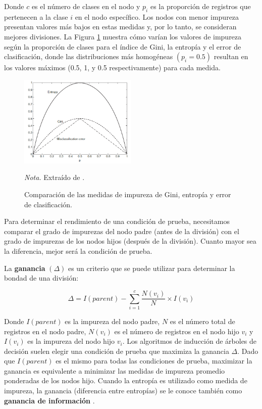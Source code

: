 Donde $c$ es el número de clases en el nodo y $p_{i}$ es la proporción de registros que pertenecen a la clase $i$ en el nodo específico. Los nodos con menor impureza presentan valores más bajos en estas medidas y, 
por lo tanto, se consideran mejores divisiones. La Figura \ref{fig:impurity} muestra cómo varían los valores de impureza según la proporción de clases para el índice de Gini, la entropía y el error de clasificación, 
donde las distribuciones más homogéneas $(p_{i} = 0.5)$ resultan en los valores máximos (0.5, 1, y 0.5 respectivamente) para cada medida.

\begin{figure}[H]
    \centering
    \caption{Comparación de las medidas de impureza de Gini, entropía y error de clasificación.}
    \includegraphics[width=0.5\textwidth]{img/4_marco_teorico/impureza.png}
    \label{fig:impurity}
    \begin{flushleft}
        \textit{Nota.} Extraído de \citet{Steinbach2004DataMC}. 
        \vspace{-\baselineskip}       
    \end{flushleft}
\end{figure}

Para determinar el rendimiento de una condición de prueba, necesitamos comparar el grado de impurezas del nodo padre (antes de la división) con el grado de impurezas de los nodos hijos (después de la división). 
Cuanto mayor sea la diferencia, mejor será la condición de prueba. 

La \textbf{ganancia} $(\Delta)$ es un criterio que se puede utilizar para determinar la bondad de una división:

\begin{equation}
    \Delta = I(parent) - \sum_{i=1}^{c} \frac{N(v_{i})}{N} \times I(v_{i})
    \label{eq:gain}
\end{equation}

Donde $I(parent)$ es la impureza del nodo padre, $N$ es el número total de registros en el nodo padre, $N(v_{i})$ es el número de registros en el nodo hijo $v_{i}$ y $I(v_{i})$ es la impureza del nodo hijo $v_{i}$.
Los algoritmos de inducción de árboles de decisión suelen elegir una condición de prueba que maximiza la ganancia $\Delta$. Dado que $I(parent)$ es el mismo para todas las condiciones de prueba, maximizar la ganancia es 
equivalente a minimizar las medidas de impureza promedio ponderadas de los nodos hijo. Cuando la entropía es utilizado como medida de impureza, la ganancia (diferencia entre entropías) se le conoce también como \textbf{ganancia de información} \citep{Steinbach2004DataMC}.

